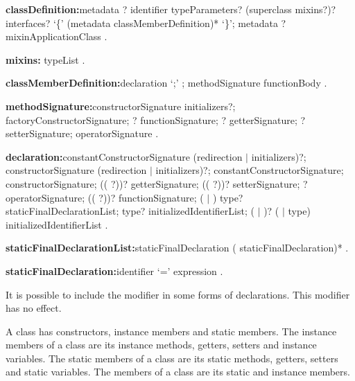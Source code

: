 \documentclass{article}
\begin{document}
\begin{grammar}
{\bf classDefinition:}metadata \ABSTRACT{}? \CLASS{} identifier typeParameters?
  \gnewline{} (superclass mixins?)? interfaces?
  \gnewline{} `\{' (metadata classMemberDefinition)* `\}';
  metadata \ABSTRACT{}? \CLASS{} mixinApplicationClass
  .

{\bf mixins:}\WITH{} typeList
  .

{\bf classMemberDefinition:}declaration `{\escapegrammar ;}' ;
  methodSignature functionBody
  .

{\bf methodSignature:}constructorSignature initializers?;
  factoryConstructorSignature;
  \STATIC{}? functionSignature;
  \STATIC{}? getterSignature;
  \STATIC{}? setterSignature;
  operatorSignature
  .

{\bf declaration:}constantConstructorSignature (redirection $|$ initializers)?;
  constructorSignature (redirection $|$ initializers)?;
  \EXTERNAL{} constantConstructorSignature;
  \EXTERNAL{} constructorSignature;
  ((\EXTERNAL{} \STATIC{}?))? getterSignature;
  ((\EXTERNAL{} \STATIC{}?))? setterSignature;
  \EXTERNAL{}? operatorSignature;
  ((\EXTERNAL{} \STATIC{}?))? functionSignature;
  \STATIC{} (\FINAL{} $|$ \CONST{}) type? staticFinalDeclarationList;
  \FINAL{} type? initializedIdentifierList;
  (\STATIC{} $|$ \COVARIANT{})? (\VAR{} $|$ type) initializedIdentifierList
  .

{\bf staticFinalDeclarationList:}staticFinalDeclaration (\gcomma{} staticFinalDeclaration)*
  .

{\bf staticFinalDeclaration:}identifier `=' expression
  .
\end{grammar}

\LMHash{}
It is possible to include the modifier \COVARIANT{} in some forms of declarations.
This modifier has no effect.


\LMHash{}
A class has constructors, instance members and static members.
The instance members of a class are its instance methods, getters, setters and instance variables.
The static members of a class are its static methods, getters, setters and static variables.
The members of a class are its static and instance members.
\end{document}
